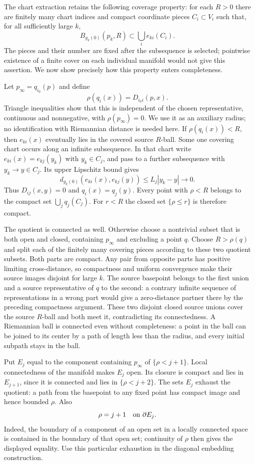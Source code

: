 The chart extraction retains the following coverage property: for each
$R>0$ there are finitely many chart indices and compact coordinate
pieces $C_i\subset V_i$ such that, for all sufficiently large $k$,
\[
                    B_{g_k(0)}(p_k,R)\subset\bigcup_i e_{ki}(C_i).
\]
The pieces and their number are fixed after the subsequence is selected;
pointwise existence of a finite cover on each individual manifold would
not give this assertion.  We now show precisely how this property
enters completeness.

Let $p_\infty=q_{i_0}(p)$ and define
\[
                    \rho(q_i(x))=D_{i_0i}(p,x).
\]
Triangle inequalities show that this is independent of the chosen
representative, continuous and nonnegative, with
$\rho(p_\infty)=0$.  We use it as an auxiliary radius; no identification
with Riemannian distance is needed here.
If $\rho(q_i(x))<R$, then $e_{ki}(x)$ eventually lies in the
covered source $R$-ball.  Some one covering chart occurs along an
infinite subsequence.  In that chart write
$e_{ki}(x)=e_{kj}(y_k)$ with $y_k\in C_j$, and pass to a further
subsequence with $y_k\to y\in C_j$.  Its upper Lipschitz bound gives
\[
 d_{g_k(0)}(e_{ki}(x),e_{kj}(y))
       \leq L_j|y_k-y|\longrightarrow0.
\]
Thus $D_{ij}(x,y)=0$ and $q_i(x)=q_j(y)$.  Every point with
$\rho<R$ belongs to the compact set $\bigcup_jq_j(C_j)$.
For $r<R$ the closed set $\{\rho\leq r\}$ is therefore compact.

The quotient is connected as well.  Otherwise choose a nontrivial
subset that is both open and closed, containing $p_\infty$ and
excluding a point $q$.  Choose $R>\rho(q)$ and split each of the
finitely many covering pieces according to these two quotient subsets.
Both parts are compact.  Any pair from opposite parts has positive
limiting cross-distance, so compactness and uniform convergence make
their source images disjoint for large $k$.  The source basepoint
belongs to the first union and a source representative of $q$ to the
second: a contrary infinite sequence of representations in a wrong
part would give a zero-distance partner there by the preceding
compactness argument.  These two disjoint closed source unions cover
the source $R$-ball and both meet it, contradicting its connectedness.
A Riemannian ball is connected even without completeness: a point
in the ball can be joined to its center by a path of length less than
the radius, and every initial subpath stays in the ball.

Put $E_j$ equal to the component containing $p_\infty$ of
$\{\rho<j+1\}$.  Local connectedness of the manifold makes $E_j$
open.  Its closure is compact and lies in $E_{j+1}$, since it is
connected and lies in $\{\rho<j+2\}$.  The sets $E_j$ exhaust the
quotient: a path from the basepoint to any fixed point has compact
image and hence bounded $\rho$.  Also
\[
                    \rho=j+1\quad\hbox{on }\partial E_j.
\]
Indeed, the boundary of a component of an open set in a locally
connected space is contained in the boundary of that open set;
continuity of $\rho$ then gives the displayed equality.
Use this particular exhaustion in the diagonal embedding construction.


